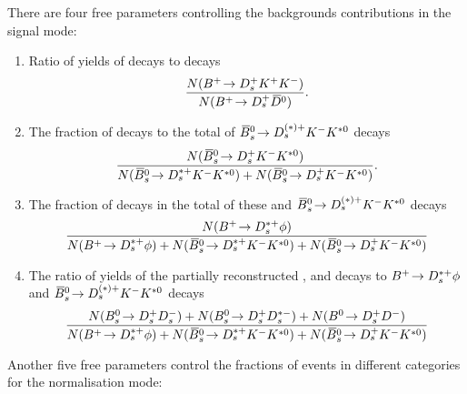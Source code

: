There are four free parameters controlling the backgrounds contributions in the signal mode:
\begin{enumerate}
\item Ratio of yields of \decay{\Bp}{\Dsp\Kp\Km} decays to \decay{\Bp}{\Dsp\Dzb} decays
\begin{equation}
\frac{N(\decay{\Bp}{\Dsp\Kp\Km})}{N(\decay{\Bp}{\Dsp\Dzb})}. 
\end{equation}
\item The fraction of \decay{\Bsb}{\Dsp\Km\Kstarz} decays to the total of $\decay{\Bsb}{D_{s}^{(*)+}\Km\Kstarz}$ decays
\begin{equation}
\frac{N(\decay{\Bsb}{\Dsp\Km\Kstarz})}{N(\decay{\Bsb}{\Dssp\Km\Kstarz})+N(\decay{\Bsb}{\Dsp\Km\Kstarz})}.
\end{equation}

\item The fraction of \decay{\Bp}{\Dssp\phiz} decays in the total of these and $\decay{\Bsb}{D_{s}^{(*)+}\Km\Kstarz}$ decays
\begin{equation}
\frac{N(\decay{\Bp}{\Dssp\phiz})}{N(\decay{\Bp}{\Dssp\phiz})+N(\decay{\Bsb}{\Dssp\Km\Kstarz})+N(\decay{\Bsb}{\Dsp\Km\Kstarz})}   
\end{equation}
\item The ratio of yields of the partially reconstructed \decay{\Bs}{\Dsp\Dsm}, \decay{\Bs}{\Dsp\Dssm} and \decay{\Bz}{\Dsp\Dm} decays to $\decay{\Bp}{\Dssp\phiz}$ and $\decay{\Bsb}{D_{s}^{(*)+}\Km\Kstarz}$ decays
\begin{equation}
\frac{N(\decay{\Bs}{\Dsp\Dsm})+ N(\decay{\Bs}{\Dsp\Dssm}) + N(\decay{\Bz}{\Dsp\Dm})}{N(\decay{\Bp}{\Dssp\phiz})+N(\decay{\Bsb}{\Dssp\Km\Kstarz})+N(\decay{\Bsb}{\Dsp\Km\Kstarz})}   
\end{equation}


\end{enumerate}


Another five free parameters control the fractions of events in different categories for the normalisation mode:

